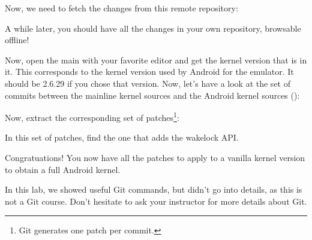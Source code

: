 Now, we need to fetch the changes from this remote repository:


A while later, you should have all the changes in your own repository,
browsable offline!

Now, open the main  with your favorite editor and get
the kernel version that is in it. This corresponds to the kernel version
used by Android for the emulator. It should be 2.6.29 if you chose that
version. Now, let's have a look at the set of commits between the
mainline kernel sources and the Android kernel sources ():


Now, extract the corresponding set of patches\footnote{Git generates
  one patch per commit.}:


In this set of patches, find the one that adds the wakelock API.

Congratuations! You now have all the patches to apply to a vanilla
kernel version to obtain a full Android kernel.

In this lab, we showed useful Git commands, but didn't go into
details, as this is not a Git course. Don't hesitate to ask your
instructor for more details about Git.
